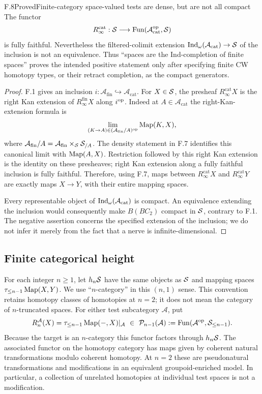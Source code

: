 \begin{claim}{F.8}{Proved}{Finite-category space-valued tests are dense, but are not all compact}
The functor
\[
 R_{\infty}^{\mathrm{cat}}:\mathcal S\longrightarrow
 \operatorname{Fun}(\mathcal A_{\mathrm{cat}}^{\mathrm{op}},\mathcal S)
\]
is fully faithful. Nevertheless the filtered-colimit extension
$\operatorname{Ind}_{\omega}(\mathcal A_{\mathrm{cat}})\to\mathcal S$ of the inclusion
is not an equivalence. Thus ``spaces are the Ind-completion of
finite spaces'' proves the intended positive statement only after
specifying finite CW homotopy types, or their retract completion,
as the compact generators.
\end{claim}
\begin{proof}
F.1 gives an inclusion
$i:\mathcal A_{\mathrm{fin}}\hookrightarrow\mathcal A_{\mathrm{cat}}$.
For $X\in\mathcal S$, the presheaf $R_{\infty}^{\mathrm{cat}}X$ is the
right Kan extension of $R_{\infty}^{\mathrm{fin}}X$ along
$i^{\mathrm{op}}$. Indeed at $A\in\mathcal A_{\mathrm{cat}}$ the
right-Kan-extension formula is
\[
 \lim_{(K\to A)\in(\mathcal A_{\mathrm{fin}}/A)^{\mathrm{op}}}
       \operatorname{Map}(K,X),
\]
where $\mathcal A_{\mathrm{fin}}/A=\mathcal A_{\mathrm{fin}}
\times_{\mathcal S}\mathcal S_{/A}$. The density statement in F.7
identifies this canonical limit with $\operatorname{Map}(A,X)$. Restriction
followed by this right Kan extension is the identity on these
presheaves; right Kan extension along a fully faithful inclusion
is fully faithful. Therefore, using F.7, maps between
$R_{\infty}^{\mathrm{cat}}X$ and $R_{\infty}^{\mathrm{cat}}Y$
are exactly maps $X\to Y$, with their entire mapping spaces.

Every representable object of
$\operatorname{Ind}_{\omega}(\mathcal A_{\mathrm{cat}})$ is compact. An
equivalence extending the inclusion would consequently make
$B(BC_2)$ compact in $\mathcal S$, contrary to F.1. The negative
assertion concerns the specified extension of the inclusion;
we do not infer it merely from the fact that a nerve is
infinite-dimensional.
\end{proof}

\subsection{Finite categorical height}

For each integer $n\geq1$, let $h_n\mathcal S$ have the same objects as
$\mathcal S$ and mapping spaces $\tau_{\leq n-1}\operatorname{Map}(X,Y)$. We use
``$n$-category'' in this $(n,1)$ sense. This convention retains
homotopy classes of homotopies at $n=2$; it does not mean the
category of $n$-truncated spaces. For either test subcategory
$\mathcal A$, put
\[
 R_n^{\mathcal A}(X)=
 \tau_{\leq n-1}\operatorname{Map}(-,X)|_{\mathcal A}
 \ \in\ \mathcal P_{n-1}(\mathcal A)
 :=\operatorname{Fun}(\mathcal A^{\mathrm{op}},\mathcal S_{\leq n-1}).
\]
Because the target is an $n$-category this functor factors through
$h_n\mathcal S$. The associated functor on the homotopy category has
maps given by coherent natural transformations modulo coherent
homotopy. At $n=2$ these are pseudonatural transformations and
modifications in an equivalent groupoid-enriched model. In
particular, a collection of unrelated homotopies at individual
test spaces is not a modification.

